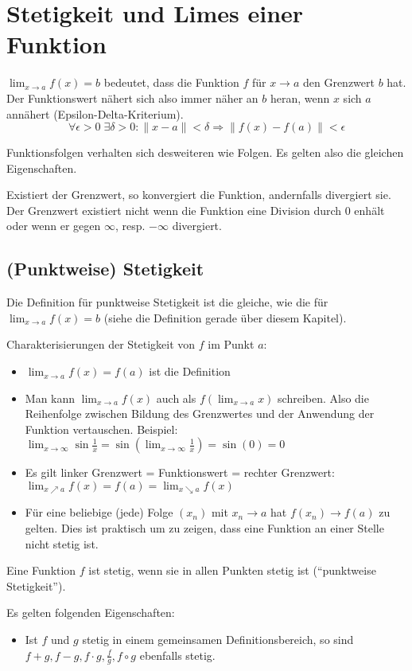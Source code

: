 \section{Stetigkeit und Limes einer Funktion}
$\lim_{x \to a} f(x) = b$ bedeutet, dass die Funktion $f$ für $x \to a$ den
Grenzwert $b$ hat. Der Funktionswert nähert sich also immer näher an $b$ heran,
wenn $x$ sich $a$ annähert (Epsilon-Delta-Kriterium).
\[
\forall \epsilon > 0 \; \exists \delta > 0: \|x -a\| < \delta \Rightarrow
\|f(x) - f(a)\| < \epsilon
\]

Funktionsfolgen verhalten sich desweiteren wie Folgen. Es gelten also die
gleichen Eigenschaften.

Existiert der Grenzwert, so konvergiert die Funktion, andernfalls divergiert sie. 
Der Grenzwert existiert nicht wenn die Funktion eine Division durch 0 enhält oder 
wenn er gegen $\infty$, resp. $-\infty$ divergiert.

\subsection{(Punktweise) Stetigkeit}
Die Definition für punktweise Stetigkeit ist die gleiche, wie die für
$\lim_{x \to a} f(x) = b$ (siehe die Definition gerade über diesem Kapitel).

Charakterisierungen der Stetigkeit von $f$ im Punkt $a$:
\begin{itemize}
	\item $\lim_{x \to a} f(x) = f(a)$ ist die Definition
	\item Man kann $\lim_{x \to a} f(x)$ auch als $f(\lim_{x \to a} x)$ schreiben.
	Also die Reihenfolge zwischen Bildung des Grenzwertes und der Anwendung der
	Funktion vertauschen. Beispiel: $\lim_{x \to \infty} \sin\frac{1}{x} =
	\sin(\lim_{x \to \infty} \frac{1}{x}) = \sin(0) = 0$
	\item Es gilt linker Grenzwert = Funktionswert = rechter Grenzwert: $\lim_{x
	\nearrow a} f(x) = f(a) = \lim_{x \searrow a} f(x)$
	\item Für eine beliebige (jede) Folge $(x_n)$ mit $x_n \to a$ hat $f(x_n) \to
	f(a)$ zu gelten. Dies ist praktisch um zu zeigen, dass eine Funktion an einer
	Stelle nicht stetig ist.
\end{itemize}

Eine Funktion $f$ ist stetig, wenn sie in allen Punkten stetig ist
(``punktweise Stetigkeit'').

Es gelten folgenden Eigenschaften:
\begin{itemize}
	\item Ist $f$ und $g$ stetig in einem gemeinsamen Definitionsbereich, so sind
	$f + g, f- g, f \cdot g, \frac{f}{g}, f \circ g$ ebenfalls stetig.
\end{itemize}

